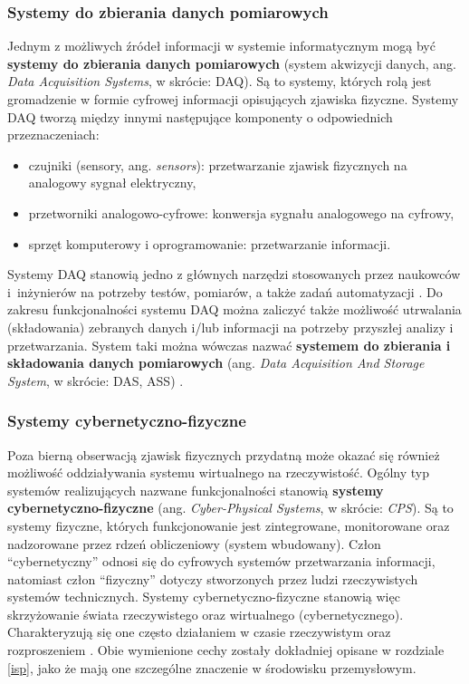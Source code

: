 \documentclass[a4paper, 12pt, twoside]{article}
\begin{document}
\subsubsection*{Systemy do zbierania danych pomiarowych}

Jednym z możliwych źródeł informacji w systemie informatycznym mogą być 
\textbf{systemy do zbierania danych pomiarowych} (system akwizycji danych, ang. \emph{Data Acquisition Systems}, w skrócie: DAQ).
Są to systemy, których rolą jest gromadzenie w formie cyfrowej informacji opisujących 
zjawiska fizyczne. Systemy DAQ tworzą między innymi następujące komponenty
o odpowiednich przeznaczeniach:
\begin{itemize}
    \item czujniki (sensory, ang. \emph{sensors}): przetwarzanie zjawisk fizycznych na analogowy sygnał elektryczny,
    \item przetworniki analogowo-cyfrowe: konwersja sygnału analogowego na cyfrowy,
    \item sprzęt komputerowy i oprogramowanie: przetwarzanie informacji. 
\end{itemize}
Systemy DAQ stanowią jedno z głównych narzędzi stosowanych przez naukowców i~inżynierów
na potrzeby testów, pomiarów, a także zadań automatyzacji \cite{data-aq-systems}.
Do zakresu funkcjonalności systemu DAQ można zaliczyć także możliwość utrwalania (składowania)
zebranych danych i/lub informacji na potrzeby przyszłej analizy i przetwarzania. 
System taki można wówczas nazwać \textbf{systemem do zbierania i składowania danych pomiarowych}
(ang. \emph{Data Acquisition And Storage System}, w skrócie: DAS, ASS) \cite{big-data-aq-storage-systems}. 

\subsubsection*{Systemy cybernetyczno-fizyczne}

Poza bierną obserwacją zjawisk fizycznych przydatną może okazać się również
możliwość oddziaływania systemu wirtualnego na rzeczywistość. Ogólny typ systemów
realizujących nazwane funkcjonalności stanowią \textbf{systemy cybernetyczno-fizyczne}
(ang. \emph{Cyber-Physical Systems}, w skrócie: \emph{CPS}).
Są to systemy fizyczne, których funkcjonowanie jest zintegrowane, monitorowane oraz 
nadzorowane przez rdzeń obliczeniowy (system wbudowany). Człon ``cybernetyczny'' odnosi
się do cyfrowych systemów przetwarzania informacji, natomiast człon ``fizyczny'' 
dotyczy stworzonych przez ludzi rzeczywistych systemów technicznych. 
Systemy cybernetyczno-fizyczne stanowią więc skrzyżowanie świata rzeczywistego oraz
wirtualnego (cybernetycznego).
Charakteryzują się one często działaniem w czasie rzeczywistym oraz rozproszeniem 
\cite{iiot-cyber-manufacturing-systems}. 
Obie wymienione cechy zostały dokładniej opisane w rozdziale \ref{isp}, 
jako że mają one szczególne znaczenie w środowisku przemysłowym. \newline
\end{document}
